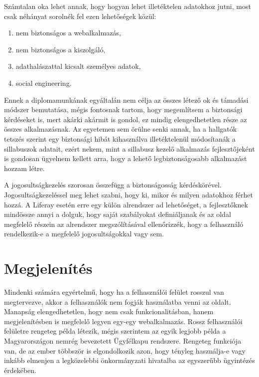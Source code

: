 \documentclass[hidelinks, 12pt, a4paper]{report}
\begin{document}
Számtalan oka lehet annak, hogy hogyan lehet illetéktelen adatokhoz jutni, most csak néhányat sorolnék fel ezen lehetőségek közül:
\begin{enumerate}
\item nem biztonságos a webalkalmazás,
\item nem biztonságos a kiszolgáló,
\item adathalászattal kicsalt személyes adatok,
\item social engineering.
\end{enumerate}

Ennek a diplomamunkának egyáltalán nem célja az összes létező ok és támadási módszer bemutatása, mégis fontosnak tartom, hogy megemlítsem a biztonsági kérdéseket is, mert akárki akármit is gondol, ez mindig elengedhetetlen része az összes alkalmazásnak. Az egyetemen sem örülne senki annak, ha a hallgatók tetszés szerint egy biztonsági hibát kihasználva illetéktelenül módosítanák a sillabuszok adatait, ezért nekem, mint a sillabusz kezelő alkalmazás fejlesztőjeként is gondosan ügyelnem kellett arra, hogy a lehető legbiztonságosabb alkalmazást hozzam létre.

A jogosultságkezelés szorosan összefügg a biztonságosság kérdéskörével. Jogosultságkezeléssel meg lehet szabni, hogy ki, mikor és milyen adatokhoz férhet hozzá. A Liferay esetén erre egy külön alrendszer ad lehetőséget, a fejlesztőknek mindössze annyi a dolguk, hogy saját szabályokat definiáljanak és az oldal megfelelő részein az alrendszer megszólításával ellenőrizzék, hogy a felhasználó rendelkezik-e a megfelelő jogosultságokkal vagy sem.


\section{Megjelenítés}

Mindenki számára egyértelmű, hogy ha a felhasználói felület rosszul van megtervezve, akkor a felhasználók nem fogják használatba venni az oldalt. Manapság elengedhetetlen, hogy nem csak funkcionalitásban, hanem megjelenítésben is megfelelő legyen egy-egy webalkalmazás. Rossz felhasználói felületre rengeteg példa létezik, mégis szerintem az egyik legjobb példa a Magyarországon nemrég bevezetett Ügyfélkapu rendszere. Rengeteg funkciója van, de az ember többször is elgondolkozik azon, hogy tényleg használja-e vagy inkább elmenjen a legközelebbi önkormányzati hivatalba az egyszerűbb ügyintézés érdekében.
\end{document}
